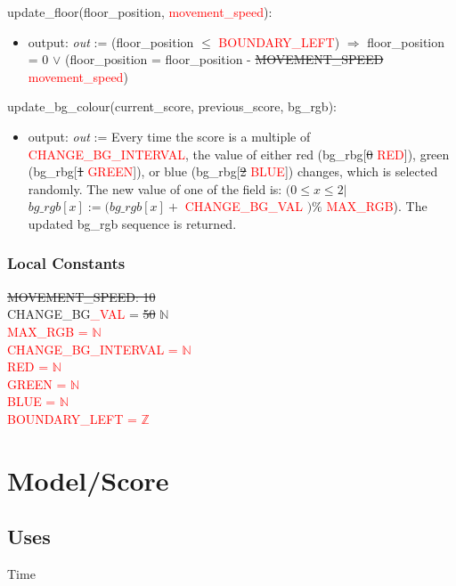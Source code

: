 \documentclass[12pt]{article}
\begin{document}
update\_floor(floor\_position, \textcolor{red}{movement\_speed}):
\begin{itemize}
    \item output: \textit{out} := (floor\_position $\leq$ \textcolor{red}{BOUNDARY\_LEFT}) $\Rightarrow$ floor\_position = 0 $\lor$ (floor\_position = floor\_position - \sout{MOVEMENT\_SPEED} \textcolor{red}{movement\_speed})
\end{itemize}
\noindent update\_bg\_colour(current\_score, previous\_score, bg\_rgb):
\begin{itemize}
    \item output: \textit{out} := Every time the score is a multiple of \textcolor{red}{CHANGE\_BG\_INTERVAL}, the value of either red (bg\_rbg[\sout{0} \textcolor{red}{RED}]), green (bg\_rbg[\sout{1} \textcolor{red}{GREEN}]), or blue (bg\_rbg[\sout{2} \textcolor{red}{BLUE}]) changes, which is selected randomly. The new value of one of the field is: $(0 \leq x \leq 2 |$ $bg\_rgb[x] := (bg\_rgb[x]+$ \textcolor{red}{CHANGE\_BG\_VAL} $)\% $ \textcolor{red}{MAX\_RGB}). The updated bg\_rgb sequence is returned.
\end{itemize}
\subsubsection* {Local Constants}
\sout{MOVEMENT\_SPEED: 10} \\
CHANGE\_BG\textcolor{red}{\_VAL} = \sout{50} $\mathbb{N}$ \\
\textcolor{red}{MAX\_RGB = $\mathbb{N}$} \\
\textcolor{red}{CHANGE\_BG\_INTERVAL = $\mathbb{N}$} \\
\textcolor{red}{RED = $\mathbb{N}$} \\
\textcolor{red}{GREEN = $\mathbb{N}$} \\
\textcolor{red}{BLUE = $\mathbb{N}$} \\
\textcolor{red}{BOUNDARY\_LEFT = $\mathbb{Z}$}
\newpage
\section*{Model/Score}

\subsection* {Uses}

Time
\end{document}
